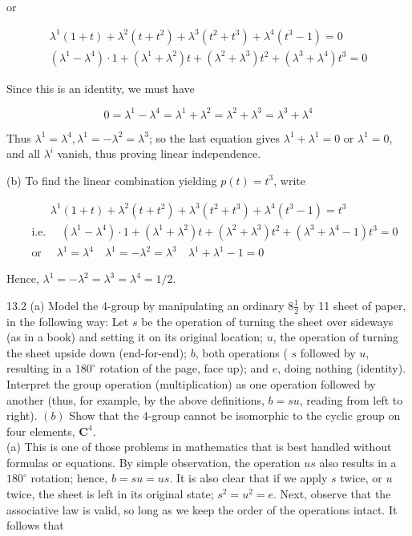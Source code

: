 \documentclass[10pt]{article}
\begin{document}
or

$$
\begin{gathered}
\lambda^{1}(1+t)+\lambda^{2}\left(t+t^{2}\right)+\lambda^{3}\left(t^{2}+t^{3}\right)+\lambda^{4}\left(t^{3}-1\right)=0 \\
\left(\lambda^{1}-\lambda^{4}\right) \cdot 1+\left(\lambda^{1}+\lambda^{2}\right) t+\left(\lambda^{2}+\lambda^{3}\right) t^{2}+\left(\lambda^{3}+\lambda^{4}\right) t^{3}=0
\end{gathered}
$$

Since this is an identity, we must have

$$
0=\lambda^{1}-\lambda^{4}=\lambda^{1}+\lambda^{2}=\lambda^{2}+\lambda^{3}=\lambda^{3}+\lambda^{4}
$$

Thus $\lambda^{1}=\lambda^{4}, \lambda^{1}=-\lambda^{2}=\lambda^{3}$; so the last equation gives $\lambda^{1}+\lambda^{1}=0$ or $\lambda^{1}=0$, and all $\lambda^{i}$ vanish, thus proving linear independence.

(b) To find the linear combination yielding $p(t)=t^{3}$, write

$$
\begin{aligned}
& \qquad \lambda^{1}(1+t)+\lambda^{2}\left(t+t^{2}\right)+\lambda^{3}\left(t^{2}+t^{3}\right)+\lambda^{4}\left(t^{3}-1\right)=t^{3} \\
& \text { i.e. } \quad\left(\lambda^{1}-\lambda^{4}\right) \cdot 1+\left(\lambda^{1}+\lambda^{2}\right) t+\left(\lambda^{2}+\lambda^{3}\right) t^{2}+\left(\lambda^{3}+\lambda^{4}-1\right) t^{3}=0 \\
& \text { or } \quad \lambda^{1}=\lambda^{4} \quad \lambda^{1}=-\lambda^{2}=\lambda^{3} \quad \lambda^{1}+\lambda^{1}-1=0
\end{aligned}
$$

Hence, $\lambda^{1}=-\lambda^{2}=\lambda^{3}=\lambda^{4}=1 / 2$.

13.2 (a) Model the 4-group by manipulating an ordinary $8 \frac{1}{2}$ by 11 sheet of paper, in the following way: Let $s$ be the operation of turning the sheet over sideways (as in a book) and setting it on its original location; $u$, the operation of turning the sheet upside down (end-for-end); $b$, both operations ( $s$ followed by $u$, resulting in a $180^{\circ}$ rotation of the page, face up); and $e$, doing nothing (identity). Interpret the group operation (multiplication) as one operation followed by another (thus, for example, by the above definitions, $b=s u$, reading from left to right). $(b)$ Show that the 4-group cannot be isomorphic to the cyclic group on four elements, $\mathbf{C}^{4}$.\\
(a) This is one of those problems in mathematics that is best handled without formulas or equations. By simple observation, the operation $u s$ also results in a $180^{\circ}$ rotation; hence, $b=s u=u s$. It is also clear that if we apply $s$ twice, or $u$ twice, the sheet is left in its original state; $s^{2}=u^{2}=e$. Next, observe that the associative law is valid, so long as we keep the order of the operations intact. It follows that
\end{document}
